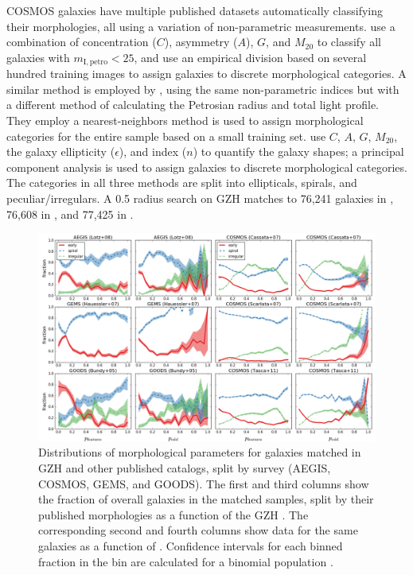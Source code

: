 \documentclass[twocolumn]{aastex6}
\begin{document}
COSMOS galaxies have multiple published datasets automatically classifying their morphologies, all using a variation of non-parametric measurements. \citet{cas07} use a combination of concentration ($C$), asymmetry ($A$), $G$, and $M_{20}$ \citep{cas05} to classify all galaxies with $m_\mathrm{I,petro}<25$, and use an empirical division based on several hundred training images to assign galaxies to discrete morphological categories. A similar method is employed by \citet{tas11}, using the same non-parametric indices but with a different method of calculating the Petrosian radius and total light profile. They employ a nearest-neighbors method is used to assign morphological categories for the entire sample based on a small training set. \citet[][ZEST]{sca07} use $C$, $A$, $G$, $M_{20}$, the galaxy ellipticity ($\epsilon$), and \sersic{} index ($n$) to quantify the galaxy shapes; a principal component analysis is used to assign galaxies to discrete morphological categories. The categories in all three methods are split into ellipticals, spirals, and peculiar/irregulars. A 0.5\arcsec{} radius search on GZH matches to 76,241 galaxies in \citet{cas07}, 76,608 in \citet{tas11}, and 77,425 in \citet{sca07}.

\begin{figure}
\center
\includegraphics[width=1.0\textwidth]{figures/comparisons.png}
\caption{Distributions of morphological parameters for galaxies matched in GZH and other published catalogs, split by survey (AEGIS, COSMOS, GEMS, and GOODS). The first and third columns show the fraction of overall galaxies in the matched samples, split by their published morphologies as a function of the GZH \pbest. The corresponding second and fourth columns show data for the same galaxies as a function of \podd. Confidence intervals for each binned fraction in the bin are calculated for a binomial population \citep{cam11}.}
\label{fig:comparisons}
\end{figure}
\end{document}

